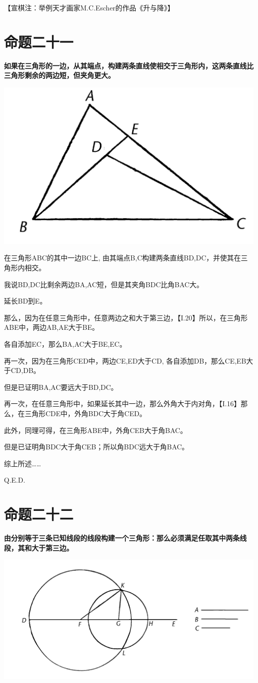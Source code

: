 \documentclass[
]{book}
\begin{document}
【宣棋注：举例天才画家M.C.Escher的作品《升与降》】

\hypertarget{ux547dux9898ux4e8cux5341ux4e00}{%
\section{命题二十一}\label{ux547dux9898ux4e8cux5341ux4e00}}

\textbf{如果在三角形的一边，从其端点，构建两条直线使相交于三角形内，这两条直线比三角形剩余的两边短，但夹角更大。}

\includegraphics[width=0.3\linewidth]{./image/img491}

在三角形ABC的其中一边BC上, 由其端点B,C构建两条直线BD,DC，并使其在三角形内相交。

我说BD,DC比剩余两边BA,AC短，但是其夹角BDC比角BAC大。

延长BD到E。

那么，因为在任意三角形中，任意两边之和大于第三边，【I.20】所以，在三角形ABE中，两边AB,AE大于BE。

各自添加EC，那么BA,AC大于BE,EC。

再一次，因为在三角形CED中，两边CE,ED大于CD, 各自添加DB，那么CE,EB大于CD,DB。

但是已证明BA,AC要远大于BD,DC。

再一次，在任意三角形中，如果延长其中一边，那么外角大于内对角，【I.16】那么，在三角形CDE中，外角BDC大于角CED。

此外，同理可得，在三角形ABE中，外角CEB大于角BAC。

但是已证明角BDC大于角CEB；所以角BDC远大于角BAC。

综上所述\ldots\ldots{}

Q.E.D.

\hypertarget{ux547dux9898ux4e8cux5341ux4e8c}{%
\section{命题二十二}\label{ux547dux9898ux4e8cux5341ux4e8c}}

\textbf{由分别等于三条已知线段的线段构建一个三角形：那么必须满足任取其中两条线段，其和大于第三边。}

\includegraphics[width=0.5\linewidth]{./image/img493}
\end{document}
